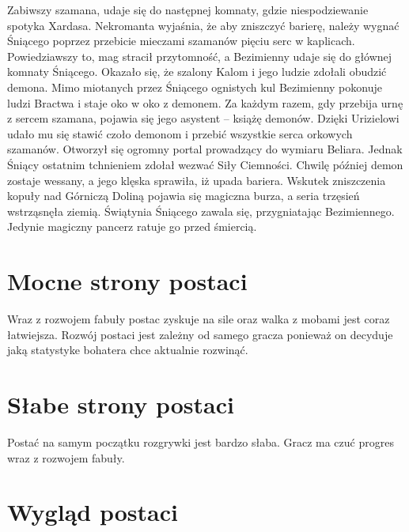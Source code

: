 \documentclass[11pt,polish, openany]{book}
\begin{document}
Zabiwszy szamana, udaje się do następnej komnaty, gdzie niespodziewanie spotyka Xardasa. Nekromanta wyjaśnia, że aby zniszczyć barierę, należy wygnać Śniącego poprzez przebicie mieczami szamanów pięciu serc w kaplicach. Powiedziawszy to, mag stracił przytomność, a Bezimienny udaje się do głównej komnaty Śniącego. Okazało się, że szalony Kalom i jego ludzie zdołali obudzić demona. Mimo miotanych przez Śniącego ognistych kul Bezimienny pokonuje ludzi Bractwa i staje oko w oko z demonem. Za każdym razem, gdy przebija urnę z sercem szamana, pojawia się jego asystent – książę demonów. Dzięki Urizielowi udało mu się stawić czoło demonom i przebić wszystkie serca orkowych szamanów. Otworzył się ogromny portal prowadzący do wymiaru Beliara. Jednak Śniący ostatnim tchnieniem zdołał wezwać Siły Ciemności. Chwilę później demon zostaje wessany, a jego klęska sprawiła, iż upada bariera. Wskutek zniszczenia kopuły nad Górniczą Doliną pojawia się magiczna burza, a seria trzęsień wstrząsnęła ziemią. Świątynia Śniącego zawala się, przygniatając Bezimiennego. Jedynie magiczny pancerz ratuje go przed śmiercią.
\newline
\section{Mocne strony postaci}
 Wraz z rozwojem fabuły postac zyskuje na sile oraz walka z mobami jest coraz łatwiejsza.
 Rozwój postaci jest zależny od samego gracza ponieważ on decyduje jaką statystyke bohatera chce aktualnie rozwinąć.
\section{Słabe strony postaci}
Postać na samym początku rozgrywki jest bardzo słaba.
Gracz ma czuć progres wraz z rozwojem fabuły.
\newline
\section{Wygląd postaci}
\end{document}
